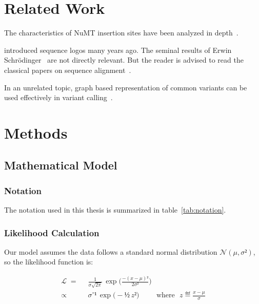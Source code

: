 \documentclass[BibLaTeXsortingNone]{PHlab-thesis}
\begin{document}
\chapter{Related Work}
The characteristics of NuMT insertion sites have been analyzed
in depth~\cite{TFH12}.

\textcite{SS90} introduced sequence logos many years ago.
The seminal results of Erwin Schrödinger~\cite{Sch26} are not directly relevant.
But the reader is advised to read the classical papers on sequence alignment~\cite{NW70,SW81,Got82,AE86}.

In an unrelated topic, graph based representation of common variants can be used effectively in variant calling~\cite{EE22}.


\chapter{Methods}
\section{Mathematical Model}
\subsection{Notation}
The notation used in this thesis is summarized in table~\ref{tab:notation}.

\subsection{Likelihood Calculation}
Our model assumes the data follows a standard normal distribution $𝒩(μ,σ²)$, so the likelihood function is:

\begin{align*}
ℒ  \;=&\;\;  \frac{1}{σ\sqrt{2π}}\, \exp\Big( \frac{-(x-μ)²}{2σ²}\Big)\\[.5ex]%
     ∝&\;\;  σ⁻¹\, \exp\big( -½\,z²)  \hspace{1cm} \text{where~~} z ≝ \frac{x-μ}{σ}
\end{align*}
\end{document}
